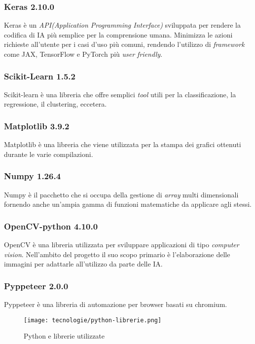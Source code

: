 \subsubsection{Keras 2.10.0}
Keras è un \emph{\gls{API}\glsfirstoccur (Application Programming Interface)} sviluppata per rendere la codifica di IA più semplice per la comprensione umana. 
Minimizza le azioni richieste all'utente per i casi d'uso più comuni, rendendo l'utilizzo di \emph{\gls{framework}} come JAX, TensorFlow e PyTorch più \emph{user friendly}.

\subsubsection{Scikit-Learn 1.5.2}
Scikit-learn è una libreria che offre semplici \emph{tool} utili per la classificazione, la regressione, il clustering, eccetera.

\subsubsection{Matplotlib 3.9.2}
Matplotlib è una libreria che viene utilizzata per la stampa dei grafici ottenuti durante le varie compilazioni. 

\subsubsection{Numpy 1.26.4}
Numpy è il pacchetto che si occupa della gestione di \emph{array} multi dimensionali fornendo anche un'ampia gamma di funzioni matematiche da applicare agli stessi.

\subsubsection{OpenCV-python 4.10.0}
OpenCV è una libreria utilizzata per sviluppare applicazioni di tipo \emph{\gls{computer vision}}\glsfirstoccur. Nell'ambito del progetto il suo scopo primario è l'elaborazione delle immagini per adattarle all'utilizzo da parte delle IA. 

\subsubsection{Pyppeteer 2.0.0}
Pyppeteer è una libreria di automazione per browser basati su chromium.

\begin{figure}[!h] 
  \centering 
  \texttt{[image: tecnologie/python-librerie.png]} 
  \caption{Python e librerie utilizzate}
  \label{fig:logo-python}
\end{figure}



